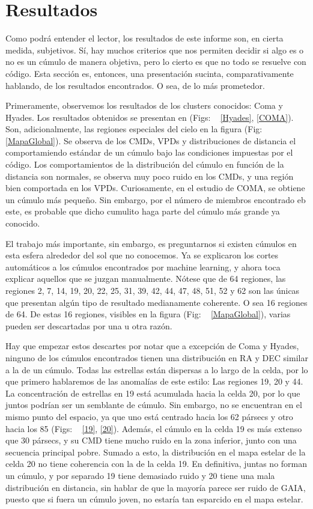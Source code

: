 \documentclass[10pt,twocolumn]{article}
\begin{document}
\section{Resultados}

Como podrá entender el lector, los resultados de este informe son, en cierta medida, subjetivos. Sí, hay muchos criterios 
que nos permiten decidir si algo es o no es un cúmulo de manera objetiva, pero lo cierto es que no todo se resuelve con código. 
Esta sección es, entonces, una presentación sucinta, comparativamente hablando, de los resultados encontrados. 
O sea, de lo más prometedor. 

Primeramente, observemos los resultados de los clusters conocidos: Coma y Hyades. Los resultados obtenidos se presentan en 
(Figs: ~ \ref{Hyades}, \ref{COMA}). Son, adicionalmente, las regiones especiales del cielo en la figura (Fig: ~ \ref{MapaGlobal}). 
Se observa de los CMDs, VPDs y distribuciones de distancia el comportamiendo estándar de un cúmulo bajo
las condiciones impuestas por el código. Los comportamientos de la distribución del cúmulo en función de la distancia son 
normales, se observa muy poco ruido en los CMDs, y una región bien comportada en los VPDs. Curiosamente, en el estudio de 
COMA, se obtiene un cúmulo más pequeño. Sin embargo, por el número de miembros encontrado eb este, es probable que dicho
cumulito haga parte del cúmulo más grande ya conocido.

El trabajo más importante, sin embargo, es preguntarnos si existen cúmulos en esta esfera alrededor del sol que no conocemos.
Ya se explicaron los cortes automáticos a los cúmulos encontrados por machine learning, y ahora toca explicar aquellos que 
se juzgan manualmente. Nótese que de 64 regiones, las regiones 2, 7, 14, 19, 20, 22, 25, 31, 39, 42, 44, 47, 48, 51, 52 y 62 
son las únicas que presentan algún tipo de resultado medianamente coherente. O sea 16 regiones de 64. De estas 16 regiones, visibles
en la figura (Fig: ~ \ref{MapaGlobal}), varias pueden ser descartadas por una u otra razón. 

Hay que empezar estos descartes por notar que a excepción de Coma y Hyades, ninguno de los cúmulos encontrados tienen una distribución en 
RA y DEC similar a la de un cúmulo. Todas las estrellas están dispersas a lo largo de la celda, por lo que primero hablaremos de las anomalías
de este estilo: Las regiones 19, 20 y 44. La concentración de estrellas en 19 está acumulada hacia la celda 20, por lo que juntos podrían
ser un semblante de cúmulo. Sin embargo, no se encuentran en el mismo punto del espacio, ya que uno está centrado hacia los 62 pársecs 
y otro hacia los 85 (Figs: ~ \ref{19}, \ref{20}). Además, el cúmulo en la celda 19 es más extenso que 30 pársecs, y su CMD tiene mucho
ruido en la zona inferior, junto con una secuencia principal pobre.  Sumado a esto, la distribución en el mapa estelar de la celda 20 
no tiene coherencia con la de la celda 19. En definitiva, juntas no forman un cúmulo, y por separado 19 tiene demasiado ruido y 20 
tiene una mala distribución en distancia, sin hablar de que la mayoría parece ser ruido de GAIA, puesto que si fuera un cúmulo joven,
no estaría tan esparcido en el mapa estelar. 
\end{document}
